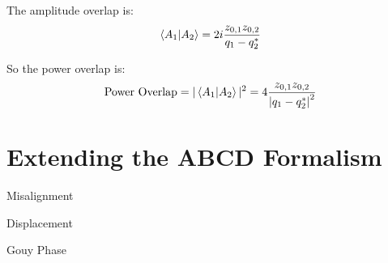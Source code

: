 \begin{appendices}
	The amplitude overlap is:
	\begin{equation}
	\braket{A_1|A_2} = 2 i  \frac{ z_{0,1}z_{0,2}}{q_1 - q_2^*}
	\end{equation}
	
	So the power overlap is:
	\begin{equation}
	\text{Power Overlap} = \vert \braket{A_1|A_2} \vert^2 = 4 \frac{ z_{0,1}z_{0,2}}{\abs{q_1 - q_2^*}^2}
	\end{equation}


\chapter{Extending the ABCD Formalism}
Misalignment

Displacement

Gouy Phase

\end{appendices} 
